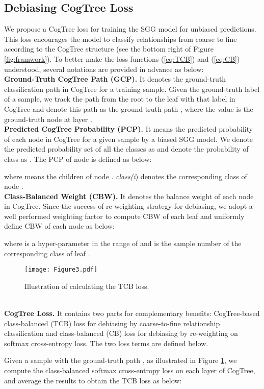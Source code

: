 \documentclass{article}
\begin{document}
\subsection{Debiasing CogTree Loss}
\label{sec:TreeLoss}
We propose a CogTree loss for training the SGG model for unbiased predictions. This loss encourages the model to classify relationships from coarse to fine according to the CogTree structure (see the bottom right of Figure \ref{fig:framwork}). To better make the loss functions (\ref{eq:TCB}) and (\ref{eq:CB}) understood, several notations are provided in advance as below:
\\
\textbf{Ground-Truth CogTree Path (GCP).} It denotes the ground-truth classification path in CogTree for a training sample. Given the ground-truth label of a sample, we track the path from the root to the leaf with that label in CogTree and denote this path as the ground-truth path , where the  value  is the ground-truth node at layer .
\\
\textbf{Predicted CogTree Probability (PCP).} It means the predicted probability of each node in CogTree for a given sample by a biased SGG model. We denote the predicted probability set of all the classes  as  and denote the probability of class  as . The PCP of node  is defined as below:

where  means the children of node . \textit{class(i}) denotes the corresponding class of node
.
\\
\textbf{Class-Balanced Weight (CBW).}  It denotes the balance weight of each node in CogTree. Since the success of re-weighting strategy for debiasing, we adopt a well performed weighting factor \cite{Cui2019Class} to compute CBW of each leaf and uniformly define CBW of each node as below:

where  is a hyper-parameter  in the range of  and  is the sample number of the corresponding class of leaf .
\begin{figure}[t]
    \centering
    \texttt{[image: Figure3.pdf]}
    \caption{Illustration of calculating the TCB loss.}
    \label{fig:treeloss}
\end{figure}
\\
\textbf{CogTree Loss.} It contains two  parts for complementary benefits: CogTree-based class-balanced (TCB) loss for debiasing by coarse-to-fine relationship classification and  class-balanced (CB) loss for debiasing by re-weighting on softmax cross-entropy loss. The two loss terms are defined below. 

Given a sample with the ground-truth path , as illustrated in Figure \ref{fig:treeloss}, we compute the class-balanced softmax cross-entropy loss on each layer of CogTree, and average the results to obtain the TCB loss as below:
\iffalse
\end{document}

